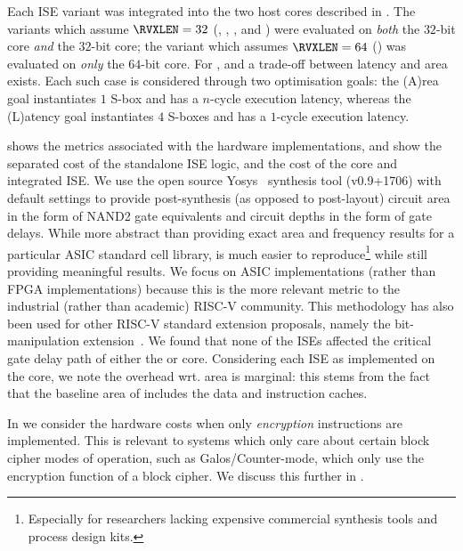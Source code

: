 
Each ISE variant was integrated into the two host cores 
described in .
The variants which assume  $\RVXLEN = 32$
(, , , and ) 
were evaluated
on {\em both} the
$32$-bit  core
{\em  and} the
$32$-bit  core;
the variant  which assumes $\RVXLEN = 64$
()
was  evaluated
on {\em only} the
$64$-bit  core.
For ,  and  a trade-off
between latency and area exists. 
Each such case is considered through two optimisation goals:
the (A)rea    goal
instantiates $1$ S-box   and has a $n$-cycle execution latency,
whereas
the (L)atency goal
instantiates $4$ S-boxes and has a $1$-cycle execution latency.

shows the metrics associated with the hardware implementations, 
and show the separated cost of the standalone ISE logic, and the
cost of the core and integrated ISE.
We use the open source Yosys~\cite{yosys} synthesis tool (v0.9+1706)
with default settings
to provide post-synthesis (as opposed to post-layout) circuit area in the
form of NAND2 gate equivalents and circuit depths in the form of gate delays.
While more abstract than providing exact area and
frequency results for a particular ASIC standard cell library, is
much easier to reproduce\footnote{
Especially
for researchers lacking expensive commercial
synthesis tools and process design kits.
} while still providing meaningful results.
We focus on ASIC implementations (rather than FPGA implementations)
because this is the more relevant metric to the industrial (rather than
academic) RISC-V community.
This methodology has also been used for other RISC-V standard extension
proposals, namely the bit-manipulation extension~\cite[Section 3.1, Page 54]{riscv:bitmanip:draft}.
We found 
that none of the ISEs affected the critical gate delay path of either the
 or  core.
Considering each ISE as implemented on the  core, we note the 
overhead wrt. area is marginal: this stems from the fact that the 
baseline area of  includes the data and instruction caches.

In
we consider the hardware costs when only {\em encryption} instructions are
implemented.
This is relevant to systems which only care about certain block cipher
modes of operation, such as Galos/Counter-mode,
which only use the encryption function of a block cipher.
We discuss this further in .

